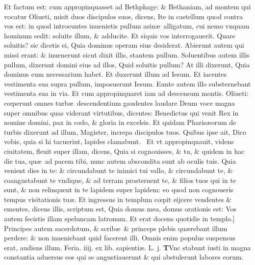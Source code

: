 \documentclass[a5paper,10pt]{book}
\def\leftmarginnote{%
	\lrmarginnote{\hskip -\marginparsep \hskip -6.5em}}
\def\rightmarginnote{%
	\lrmarginnote{\hskip\columnwidth \hskip -1em}}
\def\ae{æ}
\def\oe{œ}
\begin{document}
\begin{multicols*}{2}
Et factum est: cum appropinquasset ad Bethphage: \& Bethaniam, ad montem qui vocatur Oliueti, misit duos discipulos suos, dicens, Ite in castellum quod contra vos est: in quod introeuntes inuenietis pullum asin\ae \ alligatum, cui nemo vnquam hominum sedit: soluite illum, \& adducite.
Et siquis vos interrogauerit. Quare soluitis? sic dicetis ei, Quia dominus operam eius desiderat.
Abierunt autem qui missi erant: \& inuenerunt sicut dixit illis, stantem pullum. Soluentibus autem illis pullum, dixerunt domini eius ad illos, Quid soluitis pullum?
At illi dixerunt, Quia dominus eum necessarium habet. Et duxerunt illum ad Iesum. Et iacentes vestimenta sua supra pullum, imposuerunt Iesum.
Eunte autem illo substernebant vestimenta sua in via. Et cum appropinquaret iam ad descensum montis. Oliueti: c\oe perunt omnes turb\ae \ descendentium gaudentes laudare Deum voce magna super omnibus quas viderant virtutibus, dicentes: Benedictus qui venit Rex in nomine domini, pax in c\oe lo, \& gloria in excelsis.
Et quidam Pharis\ae orum de turbis dixerunt ad illum, Magister, increpa discipulos tuos. Quibus ipse ait, Dico vobis, quia si hi tacuerint, lapides clamabunt. \textdagger \ 
Et\leftmarginnote{\begin{flushright}C\end{flushright}} vt appropinquauit, videns ciuitatem, fleuit super illam, dicens, Quia si cognouisses, \& tu, \& quidem in hac die tua, qu\ae \ ad pacem tibi, nunc autem abscondita sunt ab oculis tuis.
Quia venient dies in te: \& circundabunt te inimici tui vallo, \& circundabunt te, \& coangustabunt te vndique, \& ad terram prosternent te, \& filios tuos qui in te sunt, \& non relinquent in te lapidem super lapidem: eo quod non cognoueris tempus visitationis tu\ae .
Et ingressus in templum c\oe pit eijcere vendentes \& ementes, dicens illis, scriptum est, Quia domus mea, domus orationis est: Vos autem fecistis illam speluncam latronum.
Et erat docens quotidie in templo.] Principes\leftmarginnote{\begin{flushright}D\end{flushright}} autem sacerdotum, \& scrib\ae \ \& princeps plebis qu\ae rebant illum perdere: \& non inueniebant quid facerent illi. Omnis enim populus suspensus erat, audiens illum.
\newline \textswab{C} \color{red} \hypertarget{WED-TERTIA-POST-ADV}{Feria. iiij.} ex lib. sapienti\ae . L. j. \color{black}
\bookmark[dest=WED-TERTIA-POST-ADV]{FERIA QVARTA}
\vspace{-.25em}
\lettrine[lines=2]{\bfseries T}{}\textdagger Vnc\rightmarginnote{c.5.a} stabunt iusti in magna constantia aduersus eos qui se angustiauerunt \& qui abstulerunt labores eorum. %

\end{multicols*}
\end{document}
